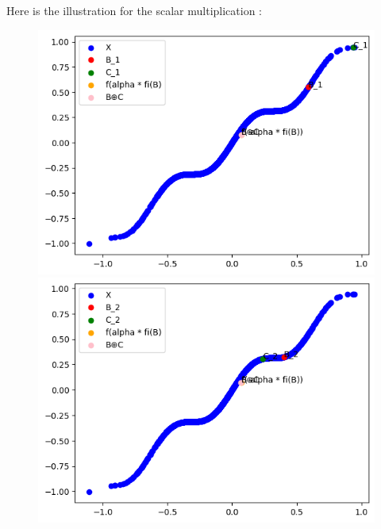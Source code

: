 \documentclass{report}
\begin{document}
            Here is the illustration for the scalar multiplication :
            \begin{figure}[h]
                \centering
                \begin{minipage}{0.5\textwidth}
                    \centering
                    \includegraphics[width=0.9\linewidth]{./images/alpha1.png}
                \end{minipage}%
                \begin{minipage}{0.5\textwidth}
                    \centering
                    \includegraphics[width=0.9\linewidth]{./images/alpha2.png}
                \end{minipage}
            \end{figure}
            
\end{document}
